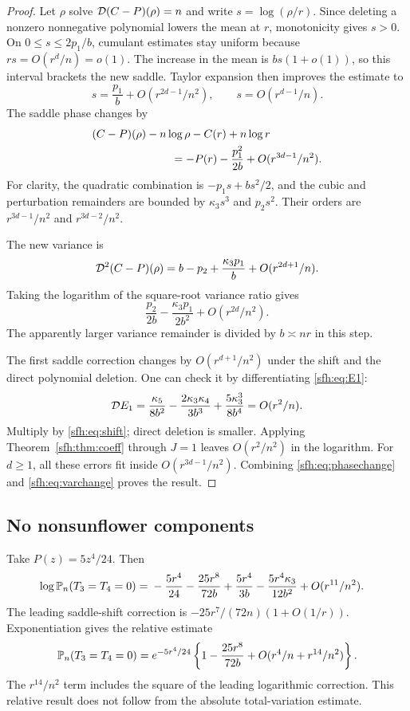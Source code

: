 \begin{proof}
Let $\rho$ solve $\mathcal D(C-P)(\rho)=n$ and write $s=\log(\rho/r)$. Since deleting a nonzero nonnegative polynomial lowers the mean at $r$, monotonicity gives $s>0$. On $0\le s\le2p_1/b$, cumulant estimates stay uniform because $rs=O(r^d/n)=o(1)$. The increase in the mean is $bs(1+o(1))$, so this interval brackets the new saddle. Taylor expansion then improves the estimate to
\begin{equation}\label{sfh:eq:shift}
 s=\frac{p_1}{b}+O(r^{2d-1}/n^2),\qquad
 s=O(r^{d-1}/n).
\end{equation}
The saddle phase changes by
\begin{align}\label{sfh:eq:phasechange}
 &(C-P)(\rho)-n\log\rho-C(r)+n\log r\nonumber\\
 &\hspace{25mm}=-P(r)-\frac{p_1^2}{2b}+O(r^{3d-1}/n^2).
\end{align}
For clarity, the quadratic combination is $-p_1s+bs^2/2$, and the cubic and perturbation remainders are bounded by $\kappa_3s^3$ and $p_2s^2$. Their orders are $r^{3d-1}/n^2$ and $r^{3d-2}/n^2$.

The new variance is
\[
 \mathcal D^2(C-P)(\rho)
 =b-p_2+\frac{\kappa_3p_1}{b}+O(r^{2d+1}/n).
\]
Taking the logarithm of the square-root variance ratio gives
\begin{equation}\label{sfh:eq:varchange}
 \frac{p_2}{2b}-\frac{\kappa_3p_1}{2b^2}+O(r^{2d}/n^2).
\end{equation}
The apparently larger variance remainder is divided by $b\asymp nr$ in this step.

The first saddle correction changes by $O(r^{d+1}/n^2)$ under the shift and the direct polynomial deletion. One can check it by differentiating \eqref{sfh:eq:E1}:
\[
 \mathcal D E_1=\frac{\kappa_5}{8b^2}
      -\frac{2\kappa_3\kappa_4}{3b^3}
      +\frac{5\kappa_3^3}{8b^4}=O(r^2/n).
\]
Multiply by \eqref{sfh:eq:shift}; direct deletion is smaller. Applying Theorem~\ref{sfh:thm:coeff} through $J=1$ leaves $O(r^2/n^2)$ in the logarithm. For $d\ge1$, all these errors fit inside $O(r^{3d-1}/n^2)$. Combining \eqref{sfh:eq:phasechange} and \eqref{sfh:eq:varchange} proves the result.
\end{proof}

\subsection{No nonsunflower components}
Take $P(z)=5z^4/24$. Then
\begin{align}\label{sfh:eq:nonsunflower}
 \log\mathbb P_n(T_3=T_4=0)
 ={}&-\frac{5r^4}{24}-\frac{25r^8}{72b}
       +\frac{5r^4}{3b}-\frac{5r^4\kappa_3}{12b^2}
       +O(r^{11}/n^2).
\end{align}
The leading saddle-shift correction is
$-25r^7/(72n)(1+O(1/r))$. Exponentiation gives the relative estimate
\begin{equation}\label{sfh:eq:nonsunflowerrel}
 \mathbb P_n(T_3=T_4=0)=e^{-5r^4/24}
 \left\{1-\frac{25r^8}{72b}
       +O(r^4/n+r^{14}/n^2)\right\}.
\end{equation}
The $r^{14}/n^2$ term includes the square of the leading logarithmic correction. This relative result does not follow from the absolute total-variation estimate.

